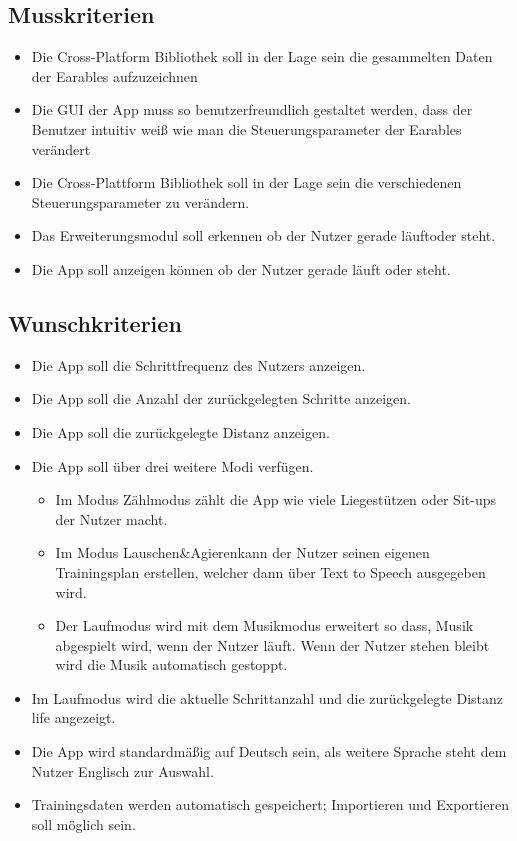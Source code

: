 \documentclass[a4paper,12pt]{article}
\begin{document}
\subsection{Musskriterien}

  \begin{itemize}
    \item\text Die Cross-Platform Bibliothek soll in der Lage sein die gesammelten Daten der \Gls{Earables} aufzuzeichnen
    \item\text Die GUI der App muss so benutzerfreundlich gestaltet werden, dass der Benutzer intuitiv weiß wie man die Steuerungsparameter der \Gls{Earables} verändert
    \item\text Die Cross-Plattform Bibliothek soll in der Lage sein die verschiedenen Steuerungsparameter zu verändern.
    \item\text Das Erweiterungsmodul soll erkennen ob der Nutzer gerade \glqq läuft\grqq{}oder \glqq steht\grqq.
    \item\text Die App soll anzeigen können ob der Nutzer gerade läuft oder steht.
  \end{itemize}
\subsection{Wunschkriterien}
  \begin{itemize}
    \item\text Die App soll die \Gls{Schrittfrequenz} des Nutzers anzeigen.
    \item\text Die App soll die Anzahl der zurückgelegten Schritte anzeigen.
    \item\text Die App soll die zurückgelegte Distanz anzeigen.
    \item\text Die App soll über drei weitere Modi verfügen.
      \begin{itemize}
        \item\text Im Modus \glqq Zählmodus\grqq{} zählt die App wie viele Liegestützen oder Sit-ups der Nutzer macht.
        \item\text  Im Modus \glqq Lauschen\&Agieren\grqq{}kann der Nutzer seinen eigenen Trainingsplan erstellen, welcher dann über Text to Speech ausgegeben wird.
        \item\text  Der \glqq Laufmodus \grqq{} wird mit dem \glqq Musikmodus\grqq{} erweitert so dass, Musik abgespielt wird, wenn der Nutzer läuft. Wenn der Nutzer stehen bleibt wird die Musik automatisch gestoppt.
      \end{itemize}
    \item\text Im \glqq Laufmodus \grqq{} wird die aktuelle Schrittanzahl und die zurückgelegte Distanz life angezeigt.
    \item\text Die App wird standardmäßig auf Deutsch sein, als weitere Sprache steht dem Nutzer Englisch zur Auswahl.
    \item\text Trainingsdaten werden automatisch gespeichert; Importieren und Exportieren soll möglich sein.
  \end{itemize}
\end{document}

